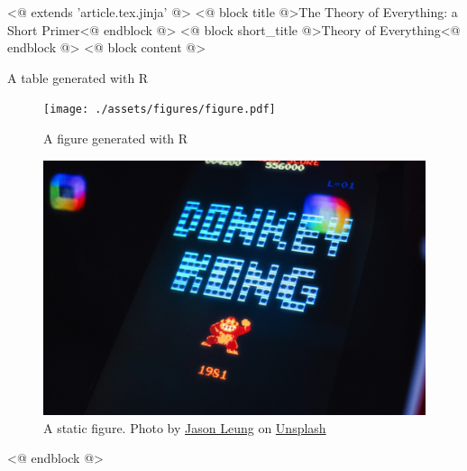 <@ extends 'article.tex.jinja' @>
<@ block title @>The Theory of Everything: a Short Primer<@ endblock @>
<@ block short_title @>Theory of Everything<@ endblock @>
<@ block content @>
\begin{table}[H]
  \centering
  
  \caption{A table generated with R}
  \label{tab:r_table}
\end{table}

\begin{figure}
  \centering
  \texttt{[image: ./assets/figures/figure.pdf]}
  \caption{A figure generated with R}
  \label{fig:r_figure}
\end{figure}

\begin{figure}
  \centering
  \includegraphics[width=\textwidth]{./assets/static/dk.jpg}
  \caption{A static figure. Photo by \href{https://unsplash.com/@ninjason?utm_content=creditCopyText&utm_medium=referral&utm_source=unsplash}{Jason Leung} on \href{https://unsplash.com/photos/donkey-kong-arcade-game-screen-with-1981-date-c5tiCWrZADc?utm_content=creditCopyText&utm_medium=referral&utm_source=unsplash}{Unsplash}
  }
  \label{fig:nice_figure}
\end{figure}
<@ endblock @>
